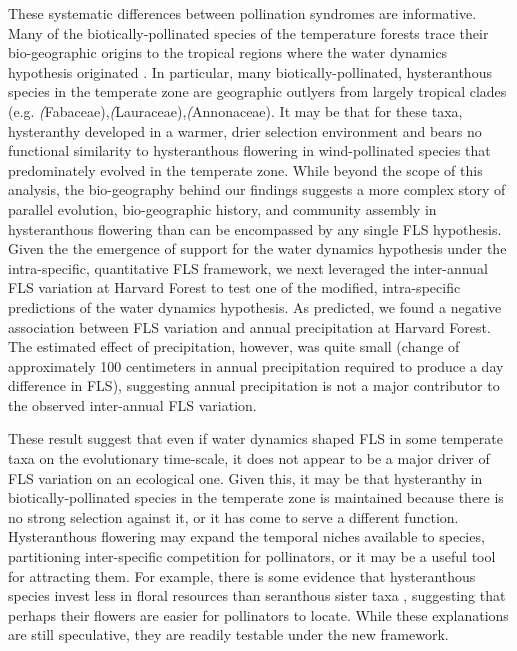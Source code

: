 \documentclass{article}
\begin{document}
\noindent These systematic differences between pollination syndromes are informative. Many of the biotically-pollinated species of the temperature forests trace their bio-geographic origins to the tropical regions \citep{Daubenmire1972} where the water dynamics hypothesis originated \citep{Janzen1967,Franklin2016}. In particular, many biotically-pollinated, hysteranthous species in the temperate zone are geographic outlyers from largely tropical clades (e.g. \textit(Fabaceae),\textit(Lauraceae),\textit(Annonaceae). It may be that for these taxa, hysteranthy developed in a warmer, drier selection environment and bears no functional similarity to hysteranthous flowering in wind-pollinated species that predominately evolved in the temperate zone. While beyond the scope of this analysis, the bio-geography behind our findings suggests a more complex story of parallel evolution, bio-geographic history, and community assembly in hysteranthous flowering than can be encompassed by any single FLS hypothesis.\\

\noindent Given the the emergence of support for the water dynamics hypothesis under the intra-specific, quantitative FLS framework, we next leveraged the inter-annual FLS variation at Harvard Forest to test one of the modified, intra-specific predictions of the water dynamics hypothesis. As predicted, we found a negative association between FLS variation and annual precipitation at Harvard Forest. The estimated effect of precipitation, however, was quite small (change of approximately 100 centimeters in annual precipitation required to produce a day difference in FLS), suggesting annual precipitation is not a major contributor to the observed inter-annual FLS variation.

\noindent These result suggest that even if water dynamics shaped FLS in some temperate taxa on the evolutionary time-scale, it does not appear to be a major driver of FLS variation on an ecological one. Given this, it may be that hysteranthy in biotically-pollinated species in the temperate zone is maintained because there is no strong selection against it, or it has come to serve a different function. Hysteranthous flowering may expand the temporal niches available to species, partitioning inter-specific competition for pollinators, or it may be a useful tool for attracting them. For example, there is some evidence that hysteranthous species invest less in floral resources than seranthous sister taxa \citep{Gunatilleke1984}, suggesting that perhaps their flowers are easier for pollinators to locate. While these explanations are still speculative, they are readily testable under the new framework.\\
\end{document}
